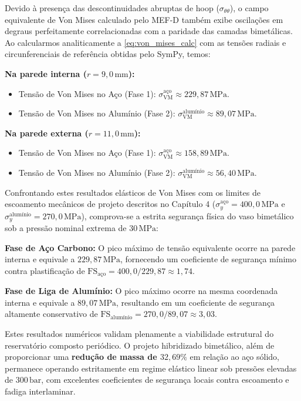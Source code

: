 Devido à presença das descontinuidades abruptas de hoop ($\sigma_{\theta\theta}$), o campo equivalente de Von Mises calculado pelo MEF-D também exibe oscilações em degraus perfeitamente correlacionadas com a paridade das camadas bimetálicas. Ao calcularmos analiticamente a \eqref{eq:von_mises_calc} com as tensões radiais e circunferenciais de referência obtidas pelo SymPy, temos:

\textbf{Na parede interna ($r = 9,0 \, \text{mm}$):}
\begin{itemize}
  \item Tensão de Von Mises no Aço (Fase 1): $\sigma_{\text{VM}}^{\text{aço}} \approx 229,87 \, \text{MPa}$.
  \item Tensão de Von Mises no Alumínio (Fase 2): $\sigma_{\text{VM}}^{\text{alumínio}} \approx 89,07 \, \text{MPa}$.
\end{itemize}

\textbf{Na parede externa ($r = 11,0 \, \text{mm}$):}
\begin{itemize}
  \item Tensão de Von Mises no Aço (Fase 1): $\sigma_{\text{VM}}^{\text{aço}} \approx 158,89 \, \text{MPa}$.
  \item Tensão de Von Mises no Alumínio (Fase 2): $\sigma_{\text{VM}}^{\text{alumínio}} \approx 56,40 \, \text{MPa}$.
\end{itemize}

Confrontando estes resultados elásticos de Von Mises com os limites de escoamento mecânicos de projeto descritos no Capítulo 4 ($\sigma_y^{\text{aço}} = 400,0 \, \text{MPa}$ e $\sigma_y^{\text{alumínio}} = 270,0 \, \text{MPa}$), comprova-se a estrita segurança física do vaso bimetálico sob a pressão nominal extrema de $30 \, \text{MPa}$:

\textbf{Fase de Aço Carbono:} O pico máximo de tensão equivalente ocorre na parede interna e equivale a $229,87 \, \text{MPa}$, fornecendo um coeficiente de segurança mínimo contra plastificação de $\text{FS}_{\text{aço}} = 400,0 / 229,87 \approx 1,74$.

\textbf{Fase de Liga de Alumínio:} O pico máximo ocorre na mesma coordenada interna e equivale a $89,07 \, \text{MPa}$, resultando em um coeficiente de segurança altamente conservativo de $\text{FS}_{\text{alumínio}} = 270,0 / 89,07 \approx 3,03$.

Estes resultados numéricos validam plenamente a viabilidade estrutural do reservatório composto periódico. O projeto hibridizado bimetálico, além de proporcionar uma \textbf{redução de massa de $32,69\%$} em relação ao aço sólido, permanece operando estritamente em regime elástico linear sob pressões elevadas de $300 \, \text{bar}$, com excelentes coeficientes de segurança locais contra escoamento e fadiga interlaminar.

